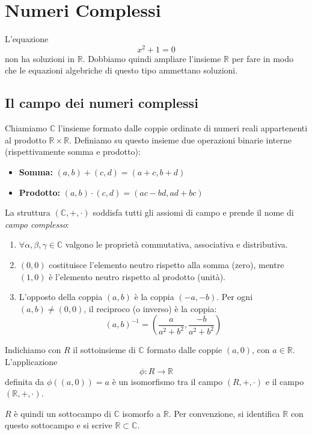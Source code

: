 \chapter{Numeri Complessi}\label{numeri-complessi}
L'equazione
\[
x^2 + 1 = 0
\]
non ha soluzioni in $\mathbb{R}$. Dobbiamo quindi ampliare l'insieme $\mathbb{R}$ per fare in modo che le equazioni algebriche di questo tipo ammettano soluzioni.

\section{Il campo dei numeri complessi}
Chiamiamo $\mathbb{C}$ l'insieme formato dalle coppie ordinate di numeri reali appartenenti al prodotto $\mathbb{R} \times \mathbb{R}$. Definiamo su questo insieme due operazioni binarie interne (rispettivamente somma e prodotto):
\begin{itemize}
    \item \textbf{Somma:} $(a, b) + (c, d) = (a+c, b+d)$
    \item \textbf{Prodotto:} $(a, b) \cdot (c, d) = (ac - bd, ad + bc)$
\end{itemize}

La struttura $(\mathbb{C}, +, \cdot)$ soddisfa tutti gli assiomi di campo e prende il nome di \emph{campo complesso}:
\begin{enumerate}
    \item $\forall \alpha, \beta, \gamma \in \mathbb{C}$ valgono le proprietà commutativa, associativa e distributiva.
    
    \item $(0, 0)$ costituisce l'elemento neutro rispetto alla somma (zero), mentre $(1, 0)$ è l'elemento neutro rispetto al prodotto (unità).
    
    \item L'opposto della coppia $(a, b)$ è la coppia $(-a, -b)$. Per ogni $(a, b) \neq (0, 0)$, il reciproco (o inverso) è la coppia:
    \[
        (a, b)^{-1} = \left( \frac{a}{a^2+b^2}, \frac{-b}{a^2+b^2} \right)
    \]
\end{enumerate}

Indichiamo con $R$ il sottoinsieme di $\mathbb{C}$ formato dalle coppie $(a, 0)$, con $a \in \mathbb{R}$.
L'applicazione 
\[
    \phi : R \to \mathbb{R}
\]
definita da $\phi((a, 0)) = a$ è un isomorfismo tra il campo $(R, +, \cdot)$ e il campo $(\mathbb{R}, +, \cdot)$.

$R$ è quindi un sottocampo di $\mathbb{C}$ isomorfo a $\mathbb{R}$. Per convenzione, si identifica $\mathbb{R}$ con questo sottocampo e si scrive $\mathbb{R} \subset \mathbb{C}$.

